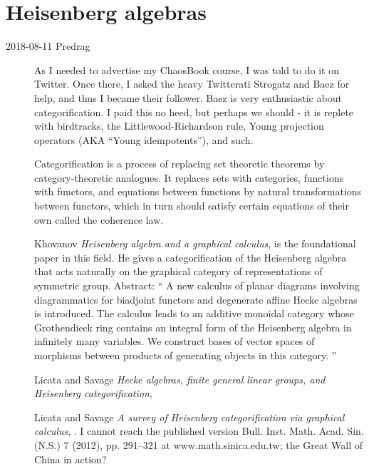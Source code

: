\newpage
\section{Heisenberg algebras}
\label{s-Heisenberg}

\begin{description}

\item[2018-08-11 Predrag]
As I needed to advertise my
 {ChaosBook} course, I was
told to do it on Twitter. Once there, I asked the heavy Twitterati
Strogatz and  {Baez} for help,
and thus I became their follower. Baez is very enthusiastic about
categorification. I paid this no heed, but perhaps we should - it is
replete with birdtracks, the Littlewood-Richardson rule, Young projection
operators (AKA ``Young idempotents''), and such.

Categorification is a process of replacing set theoretic
theorems by category-theoretic analogues. It replaces sets with
categories, functions with functors, and equations between functions by
natural transformations between functors, which in turn should satisfy
certain equations of their own called the coherence law.

Khovanov {\em Heisenberg algebra and a graphical calculus},
 is the foundational paper in this field.
He gives a categorification of the Heisenberg algebra that acts naturally
on the graphical category of representations  of  symmetric  group.
Abstract: ``
A new calculus of planar diagrams involving diagrammatics for biadjoint
functors and degenerate affine Hecke algebras is introduced. The calculus
leads to an additive monoidal category whose Grothendieck ring contains
an integral form of the Heisenberg algebra in infinitely many variables.
We construct bases of vector spaces of morphisms between products of
generating objects in this category.
''

Licata and Savage {\em Hecke algebras, finite general linear
groups, and {Heisenberg } categorification}, 

Licata and Savage {\em A survey of {Heisenberg}
categorification via graphical calculus},
. I cannot reach the published version
Bull. Inst. Math. Acad. Sin. (N.S.) 7 (2012), pp. 291--321
at  {www.math.sinica.edu.tw};
the Great Wall of China in action?


\end{description}
